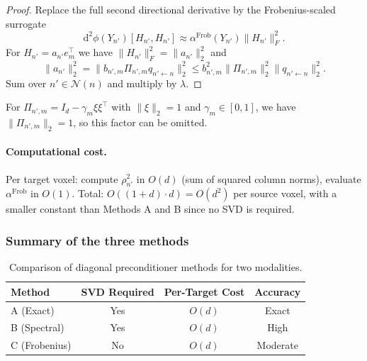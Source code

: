 \begin{proof}
Replace the full second directional derivative by the Frobenius-scaled surrogate
\begin{equation}
\mathrm{d}^2 \phi(Y_{n'})[H_{n'}, H_{n'}] \approx \alpha^{\mathrm{Frob}}(Y_{n'}) \|H_{n'}\|_F^2.
\end{equation}
For $H_{n'} = a_{n'} e_m^\top$ we have $\|H_{n'}\|_F^2 = \|a_{n'}\|_2^2$ and
\begin{equation}
\|a_{n'}\|_2^2 = \|b_{n',m} \Pi_{n',m} q_{n' \leftarrow n}\|_2^2 \leq b_{n',m}^2 \|\Pi_{n',m}\|_2^2 \|q_{n' \leftarrow n}\|_2^2.
\end{equation}
Sum over $n' \in \mathcal{N}(n)$ and multiply by $\lambda$.
\end{proof}

\begin{remark}
For $\Pi_{n',m} = I_d - \gamma_m \xi \xi^\top$ with $\|\xi\|_2 = 1$ and $\gamma_m \in [0, 1]$, we have $\|\Pi_{n',m}\|_2 = 1$, so this factor can be omitted.
\end{remark}

\paragraph{Computational cost.} Per target voxel: compute $\rho_{n'}^2$ in $O(d)$ (sum of squared column norms), evaluate $\alpha^{\mathrm{Frob}}$ in $O(1)$. Total: $O((1+d) \cdot d) = O(d^2)$ per source voxel, with a smaller constant than Methods A and B since no SVD is required.

\subsubsection{Summary of the three methods}

\begin{table}[h]
\centering
\begin{tabular}{lccc}
\toprule
\textbf{Method} & \textbf{SVD Required} & \textbf{Per-Target Cost} & \textbf{Accuracy} \\
\midrule
A (Exact) & Yes & $O(d)$ & Exact \\
B (Spectral) & Yes & $O(d)$ & High \\
C (Frobenius) & No & $O(d)$ & Moderate \\
\bottomrule
\end{tabular}
\caption{Comparison of diagonal preconditioner methods for two modalities.}
\label{tab:precond_comparison}
\end{table}

